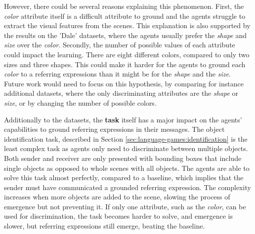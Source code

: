 However, there could be several reasons explaining this phenomenon.
First, the \emph{color} attribute itself is a difficult attribute to ground and the agents struggle to extract the visual features from the scenes.
This explanation is also supported by the results on the 'Dale' datasets, where the agents usually prefer the \emph{shape} and \emph{size} over the \emph{color}.
Secondly, the number of possible values of each attribute could impact the learning.
There are eight different colors, compared to only two sizes and three shapes.
This could make it harder for the agents to ground each \emph{color} to a referring expressions than it might be for the \emph{shape} and the \emph{size}.
Future work would need to focus on this hypothesis, by comparing for instance additional datasets, where the only discriminating attributes are the \emph{shape} or \emph{size}, or by changing the number of possible colors.

Additionally to the datasets, the \textbf{task} itself has a major impact on the agents' capabilities to ground referring expressions in their messages.
The object identification task, described in Section \ref{sec:language-games:identification} is the least complex task as agents only need to discriminate between multiple objects.
Both sender and receiver are only presented with bounding boxes that include single objects as opposed to whole scenes with all objects.
The agents are able to solve this task almost perfectly, compared to a baseline, which implies that the sender must have communicated a grounded referring expression.
The complexity increases when more objects are added to the scene, slowing the process of emergence but not preventing it.
If only one attribute, such as the \emph{color}, can be used for discrimination, the task becomes harder to solve, and emergence is slower, but referring expressions still emerge, beating the baseline.

